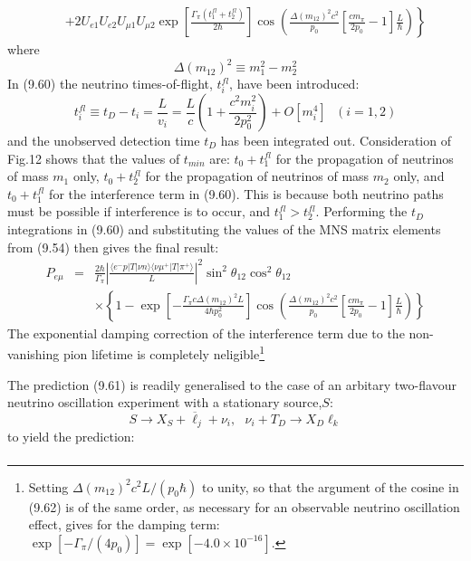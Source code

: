 {\begin{eqnarray}
   &   & \left. +2 U_{e 1}U_{e 2}U_{\mu 1} U_{\mu 2}\exp\left[\frac{\Gamma_{\pi}(t_1^{fl}+t_2^{fl})}{2 \hbar}\right]
        \cos\left(\frac{\Delta(m_{12})^2 c^2}{p_0}\left[\frac{c m_{\pi}}{2 p_0}-1\right]\frac{L}{\hbar}\right) \right\}
   \end{eqnarray}
  where
 \[\Delta(m_{12})^2  \equiv m_1^2-m_2^2  \]
  In (9.60) the neutrino times-of-flight, $t_i^{fl}$, have been introduced:
     \begin{equation}
     t_i^{fl} \equiv t_D-t_i = \frac{L}{v_i}= \frac{L}{c}\left(1+\frac{c^2 m_i^2}{2 p_0^2} \right) + O[m_i^4]~~~(i=1, 2)
     \end{equation}
 and the unobserved detection time $t_D$ has been integrated out.
  Consideration of Fig.12 shows that the values of $t_{min}$ are: $t_0+t_1^{fl}$ for the propagation
  of neutrinos of mass $m_1$ only, $t_0+t_2^{fl}$ for the propagation
  of neutrinos of mass $m_2$ only, and $t_0+t_1^{fl}$ for the interference term in (9.60). This is because
  both neutrino paths must be possible if interference is to occur, and $t_1^{fl}>t_2^{fl}$. Performing the 
   $t_D$ integrations in (9.60) and substituting the values of the MNS matrix elements from (9.54) then
   gives the final result:
      \begin{eqnarray}
       P_{e \mu} & = & \frac{2 \hbar}{\Gamma_{\pi}}\left|\frac{\langle e^-  p |T|\nu n \rangle
        \langle \nu \mu^+ |T|\pi^+ \rangle}{L}\right|^2 \sin^2 \theta_{12} \cos^2 \theta_{12} \nonumber \\
   &  &  \times \left\{ 1- \exp\left[-\frac{\Gamma_{\pi}c \Delta(m_{12})^2 L}{4 \hbar p_0^2}\right]
         \cos\left(\frac{\Delta(m_{12})^2 c^2}{p_0}\left[\frac{c m_{\pi}}{2 p_0}-1\right]\frac{L}{\hbar}\right) \right\}
    \end{eqnarray}
     The exponential damping correction of the interference term due to the non-vanishing pion lifetime
    is completely neligible\footnote{Setting $\Delta(m_{12})^2 c^2 L/(p_0 \hbar)$ to unity, so that the argument
    of the cosine in (9.62) is of the same order, as necessary for an observable neutrino oscillation
    effect, gives for the damping term: $\exp[-\Gamma_{\pi}/(4 p_0)] = \exp[-4.0 \times 10^{-16}]$.}
    \par  The prediction (9.61) is readily generalised to the case of an arbitary two-flavour neutrino oscillation
     experiment with a stationary source,$S$:
    \[    S \rightarrow X_S+ \overline{\ell}_j + \nu_i,~~~ \nu_i+ T_D \rightarrow X_D \ell_k \]
     to yield the prediction:
       \begin{eqnarray}

\end{eqnarray}}
